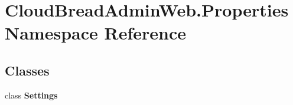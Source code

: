 \hypertarget{namespace_cloud_bread_admin_web_1_1_properties}{}\section{Cloud\+Bread\+Admin\+Web.\+Properties Namespace Reference}
\label{namespace_cloud_bread_admin_web_1_1_properties}
\subsection*{Classes}
\begin{DoxyCompactItemize}
\item 
class {\bfseries Settings}
\end{DoxyCompactItemize}
